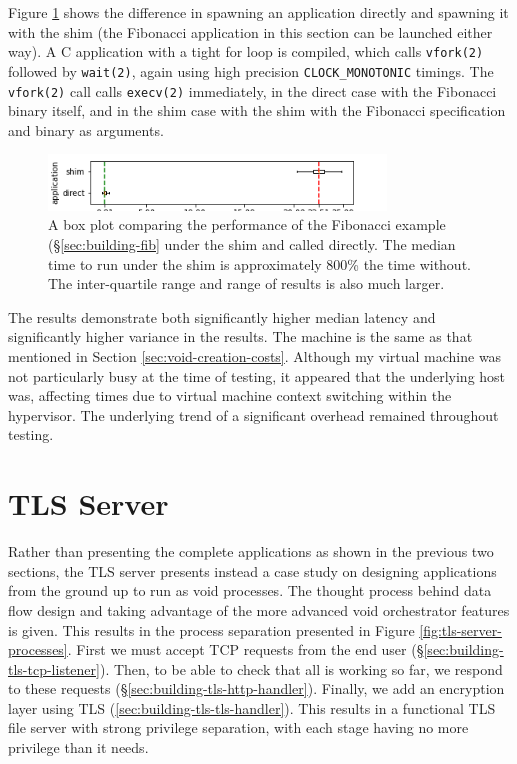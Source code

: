 \documentclass[12pt,a4paper,twoside]{report}
\begin{document}
Figure \ref{fig:fib-launch-times} shows the difference in spawning an application directly and spawning it with the shim (the Fibonacci application in this section can be launched either way). A C application with a tight for loop is compiled, which calls \texttt{vfork(2)} followed by \texttt{wait(2)}, again using high precision \texttt{CLOCK\_MONOTONIC} timings. The \texttt{vfork(2)} call calls \texttt{execv(2)} immediately, in the direct case with the Fibonacci binary itself, and in the shim case with the shim with the Fibonacci specification and binary as arguments.

\begin{figure}
    \centering
    \includegraphics[width=0.8\textwidth]{graphs/fib_startup.png}

    \caption{A box plot comparing the performance of the Fibonacci example (§\ref{sec:building-fib} under the shim and called directly. The median time to run under the shim is approximately 800\% the time without. The inter-quartile range and range of results is also much larger.}
    \label{fig:fib-launch-times}
\end{figure}

The results demonstrate both significantly higher median latency and significantly higher variance in the results. The machine is the same as that mentioned in Section \ref{sec:void-creation-costs}. Although my virtual machine was not particularly busy at the time of testing, it appeared that the underlying host was, affecting times due to virtual machine context switching within the hypervisor. The underlying trend of a significant overhead remained throughout testing.

\section{TLS Server}
\label{sec:building-tls}

Rather than presenting the complete applications as shown in the previous two sections, the TLS server presents instead a case study on designing applications from the ground up to run as void processes. The thought process behind data flow design and taking advantage of the more advanced void orchestrator features is given. This results in the process separation presented in Figure \ref{fig:tls-server-processes}. First we must accept TCP requests from the end user (§\ref{sec:building-tls-tcp-listener}). Then, to be able to check that all is working so far, we respond to these requests (§\ref{sec:building-tls-http-handler}). Finally, we add an encryption layer using TLS (\ref{sec:building-tls-tls-handler}). This results in a functional TLS file server with strong privilege separation, with each stage having no more privilege than it needs.
\end{document}

